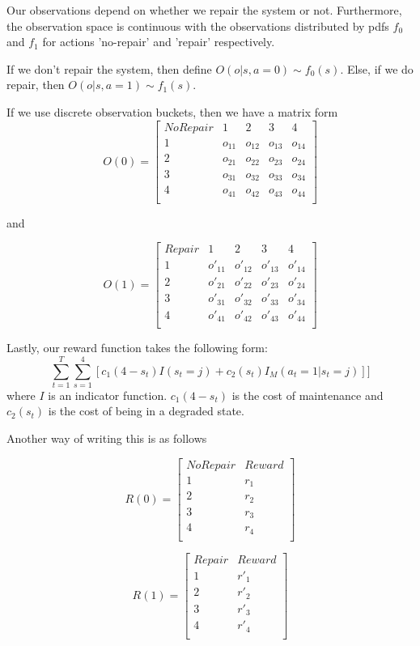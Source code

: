 \documentclass[english]{article}
\numberwithin{equation}{section}
\begin{document}
Our observations depend on whether we repair the system or not. Furthermore, the observation space is continuous with the observations distributed by pdfs $f_0$ and $f_1$ for actions 'no-repair' and 'repair' respectively.

If we don't repair the system, then define $O(o|s,a=0) \sim f_0(s)$. Else, if we do repair, then $O(o|s,a=1) \sim f_1(s)$.

If we use discrete observation buckets, then we have a matrix form
$$    O(0) = 
\begin{bmatrix}
No Repair & 1 & 2 & 3 & 4 \\
1 & o_{11} & o_{12} & o_{13} & o_{14} \\
2 & o_{21} & o_{22} & o_{23} & o_{24} \\
3 & o_{31} & o_{32} & o_{33} & o_{34} \\
4 & o_{41} & o_{42} & o_{43} & o_{44} \\
\end{bmatrix}
$$

and

$$    O(1) = 
\begin{bmatrix}
Repair & 1 & 2 & 3 & 4 \\
1 & o'_{11} & o'_{12} & o'_{13} & o'_{14} \\
2 & o'_{21} & o'_{22} & o'_{23} & o'_{24} \\
3 & o'_{31} & o'_{32} & o'_{33} & o'_{34} \\
4 & o'_{41} & o'_{42} & o'_{43} & o'_{44} \\
\end{bmatrix}
$$

Lastly, our reward function takes the following form:
$$\sum_{t=1}^T \sum_{s=1}^4 [c_1(4-s_t)I(s_t=j) + c_2(s_t)I_M(a_t=1|s_t=j)]]$$
where $I$ is an indicator function. $c_1(4-s_t)$ is the cost of maintenance and $c_2(s_t)$ is the cost of being in a degraded state.

Another way of writing this is as follows

$$
R(0) = 
\begin{bmatrix}
No Repair & Reward \\
1 & r_1 \\
2 & r_2 \\
3 & r_3 \\
4 & r_4 \\
\end{bmatrix}
$$

$$
R(1) = 
\begin{bmatrix}
Repair & Reward \\
1 & r'_1 \\
2 & r'_2 \\
3 & r'_3 \\
4 & r'_4 \\
\end{bmatrix}
$$
\end{document}
